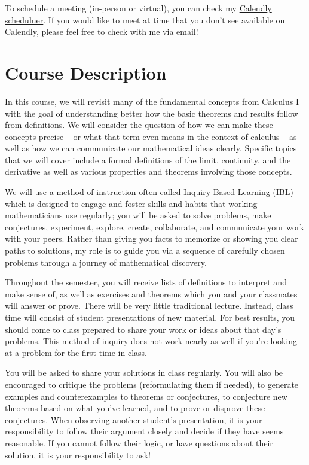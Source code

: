 \documentclass[
  letterpaper,
  DIV=11,
  numbers=noendperiod]{scrreprt}
\begin{document}
To schedule a meeting (in-person or virtual), you can check my
\href{https://calendly.com/hallstro}{Calendly scheduluer}. If you would
like to meet at time that you don't see available on Calendly, please
feel free to check with me via email!


\chapter{Course Description}\label{course-description}

In this course, we will revisit many of the fundamental concepts from
Calculus I with the goal of understanding better how the basic theorems
and results follow from definitions. We will consider the question of
how we can make these concepts precise -- or what that term even means
in the context of calculus -- as well as how we can communicate our
mathematical ideas clearly. Specific topics that we will cover include a
formal definitions of the limit, continuity, and the derivative as well
as various properties and theorems involving those concepts.

We will use a method of instruction often called Inquiry Based Learning
(IBL) which is designed to engage and foster skills and habits that
working mathematicians use regularly; you will be asked to solve
problems, make conjectures, experiment, explore, create, collaborate,
and communicate your work with your peers. Rather than giving you facts
to memorize or showing you clear paths to solutions, my role is to guide
you via a sequence of carefully chosen problems through a journey of
mathematical discovery.

Throughout the semester, you will receive lists of definitions to
interpret and make sense of, as well as exercises and theorems which you
and your classmates will answer or prove. There will be very little
traditional lecture. Instead, class time will consist of student
presentations of new material. For best results, you should come to
class prepared to share your work or ideas about that day's problems.
This method of inquiry does not work nearly as well if you're looking at
a problem for the first time in-class.

You will be asked to share your solutions in class regularly. You will
also be encouraged to critique the problems (reformulating them if
needed), to generate examples and counterexamples to theorems or
conjectures, to conjecture new theorems based on what you've learned,
and to prove or disprove these conjectures. When observing another
student's presentation, it is your responsibility to follow their
argument closely and decide if they have seems reasonable. If you cannot
follow their logic, or have questions about their solution, it is your
responsibility to ask!
\end{document}
